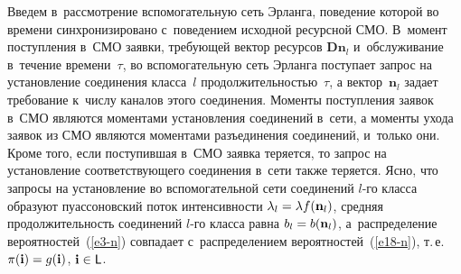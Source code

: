 \begin{multicols}{2}
  Введем в~рассмотрение вспомогательную сеть Эрланга, поведение которой 
во времени синхронизировано с~поведением исходной ресурсной СМО. 
В~момент поступления в~СМО заявки, требующей вектор ресурсов 
$\mathbf{Dn}_l$ и~обслуживание в~течение времени~$\tau$, во 
вспомогательную сеть Эрланга поступает запрос на установление соединения 
класса~$l$ продолжительностью~$\tau$, а вектор~$\mathbf{n}_l$ задает 
требование к~числу каналов этого соединения. Моменты поступления заявок 
в~СМО являются моментами установления соединений в~сети, а моменты 
ухода заявок из СМО являются моментами разъединения соединений, и~только 
они. Кроме того, если поступившая в~СМО заявка теряется, то запрос на 
установление соответствующего соединения в~сети также теряется. Ясно, что 
запросы на установление во вспомогательной сети соединений $l$-го класса 
образуют пуассоновский поток интенсивности $\lambda_l\hm= \lambda 
f(\mathbf{n}_l)$, средняя продолжительность соединений $l$-го класса равна 
$b_l\hm= b(\mathbf{n}_l)$, а~распределение вероятностей~(\ref{e3-n}) 
совпадает с~распределением вероятностей~(\ref{e18-n}), т.\,е.\ $\pi(\mathbf{i}) 
\hm= g(\mathbf{i})$, $\mathbf{i}\hm\in {\sf L}$.
  



\end{multicols}
